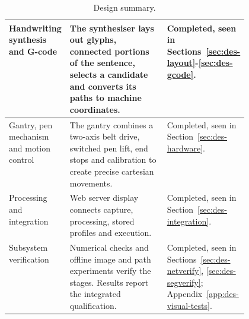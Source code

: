 \begin{table}[!htbp]
\begin{tabularx}{\linewidth}{|>{\raggedright\arraybackslash}p{0.24\linewidth}|>{\raggedright\arraybackslash}X|>{\raggedright\arraybackslash}p{0.23\linewidth}|}
Handwriting synthesis and G-code&The synthesiser lays out glyphs, connected portions of the sentence, selects a candidate and converts its paths to machine coordinates.&Completed, seen in Sections~\ref{sec:des-layout}-\ref{sec:des-gcode}.\\\hline
Gantry, pen mechanism and motion control&The gantry combines a two-axis belt drive, switched pen lift, end stops and calibration to create precise cartesian movements.&Completed, seen in Section~\ref{sec:des-hardware}.\\\hline
Processing and integration&Web server display connects capture, processing, stored profiles and execution.&Completed, seen in Section~\ref{sec:des-integration}.\\\hline
Subsystem verification&Numerical checks and offline image and path experiments verify the stages. Results report the integrated qualification.&Completed, seen in Sections~\ref{sec:des-netverify}, \ref{sec:des-segverify}; Appendix~\ref{app:des-visual-tests}.\\\hline
\end{tabularx}
\caption{Design summary.}
\label{tab:des-summary}
\end{table}

\FloatBarrier
